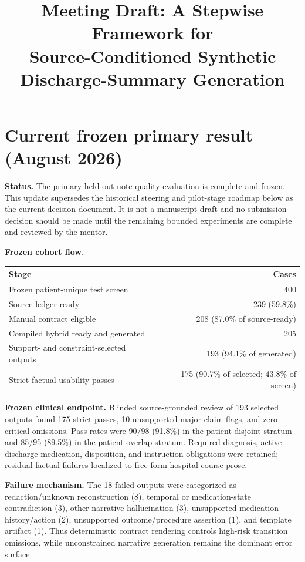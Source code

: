 \documentclass[11pt]{article}
\title{Meeting Draft: A Stepwise Framework for\\
Source-Conditioned Synthetic Discharge-Summary Generation}
\author{}
\date{}
\begin{document}
\maketitle

\section*{Current frozen primary result (August 2026)}

\textbf{Status.} The primary held-out note-quality evaluation is complete and
frozen. This update supersedes the historical steering and pilot-stage roadmap
below as the current decision document. It is not a manuscript draft and no
submission decision should be made until the remaining bounded experiments are
complete and reviewed by the mentor.

\textbf{Frozen cohort flow.}
\begin{center}
\begin{tabular}{lr}
\toprule
Stage & Cases \\
\midrule
Frozen patient-unique test screen & 400 \\
Source-ledger ready & 239 (59.8\%) \\
Manual contract eligible & 208 (87.0\% of source-ready) \\
Compiled hybrid ready and generated & 205 \\
Support- and constraint-selected outputs & 193 (94.1\% of generated) \\
Strict factual-usability passes & 175 (90.7\% of selected; 43.8\% of screen) \\
\bottomrule
\end{tabular}
\end{center}

\textbf{Frozen clinical endpoint.} Blinded source-grounded review of 193
selected outputs found 175 strict passes, 10 unsupported-major-claim flags,
and zero critical omissions. Pass rates were 90/98 (91.8\%) in the
patient-disjoint stratum and 85/95 (89.5\%) in the patient-overlap stratum.
Required diagnosis, active discharge-medication, disposition, and instruction
obligations were retained; residual factual failures localized to free-form
hospital-course prose.

\textbf{Failure mechanism.} The 18 failed outputs were categorized as
redaction/unknown reconstruction (8), temporal or medication-state
contradiction (3), other narrative hallucination (3), unsupported medication
history/action (2), unsupported outcome/procedure assertion (1), and template
artifact (1). Thus deterministic contract rendering controls high-risk
transition omissions, while unconstrained narrative generation remains the
dominant error surface.
\end{document}
